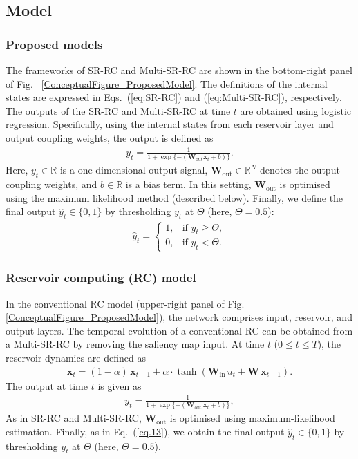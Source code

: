 \documentclass[pdflatex,sn-nature]{sn-jnl}
\theoremstyle{thmstyleone}%
\theoremstyle{thmstyletwo}%
\theoremstyle{thmstylethree}%
\begin{document}
\subsection*{Model}

\subsubsection*{Proposed models}
The frameworks of SR-RC and Multi-SR-RC are shown in the bottom-right panel of Fig. ~\ref{ConceptualFigure_ProposedModel}.
The definitions of the internal states are expressed in Eqs.~(\ref{eq:SR-RC}) and (\ref{eq:Multi-SR-RC}), respectively.
The outputs of the SR-RC and Multi-SR-RC at time $t$ are obtained using logistic regression.
Specifically, using the internal states from each reservoir layer and output coupling weights, the output is defined as
\begin{align}
    y_{t}=\frac{1}{1+\exp\{-(\mathbf{W}_{\mathrm{out}}\mathbf{x}_{t}+b)\}} . \label{eq.out12}
\end{align}
Here, $y_t\in\mathbb{R}$ is a one-dimensional output signal, $\mathbf{W}_{\mathrm{out}}\in\mathbb{R}^{N}$ denotes the output coupling weights, and $b\in\mathbb{R}$ is a bias term.
In this setting, $\mathbf{W}_{\mathrm{out}}$ is optimised using the maximum likelihood method (described below).
Finally, we define the final output $\hat{y}_t \in \{0,1\}$ by thresholding $y_t$ at $\Theta$ (here, $\Theta=0.5$):
\begin{align}
    \hat{y}_t =
        \begin{cases}
            1, & \text{if } y_t \ge \Theta, \\
            0, & \text{if } y_t < \Theta.
        \end{cases}
        \label{eq.13}
\end{align}

\subsubsection*{Reservoir computing (RC) model} \label{RC}
In the conventional RC model (upper-right panel of Fig.\ref{ConceptualFigure_ProposedModel}), the network comprises input, reservoir, and output layers. 
The temporal evolution of a conventional RC can be obtained from a Multi-SR-RC by removing the saliency map input. 
At time $t$ ($0\le t\le T$), the reservoir dynamics are defined as
\begin{align} 
    \mathbf{x}_t = (1-\alpha)\,\mathbf{x}_{t-1} + \alpha \cdot \tanh\left(\mathbf{W}_{\mathrm{in}}\,u_t + \mathbf{W}\,\mathbf{x}_{t-1}\right).
\end{align} 
The output at time \(t\) is given as
\begin{align} 
   y_{t} = \frac{1}{1+\exp\{-({\mathbf{W}_{\mathrm{out}}\,\mathbf{x}_{t}}+b)\}},\label{eq.out14}
\end{align} 
As in SR-RC and Multi-SR-RC, $\mathbf{W}_{\mathrm{out}}$ is optimised using maximum-likelihood estimation.
Finally, as in Eq.~(\ref{eq.13}), we obtain the final output $\hat{y}_t \in \{0,1\}$ by thresholding $y_t$ at $\Theta$ (here, $\Theta=0.5$).
\end{document}
